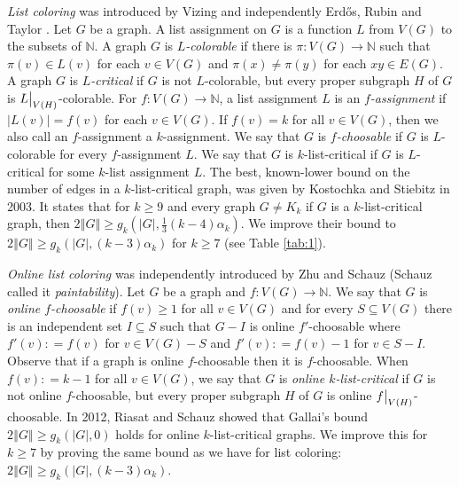 \documentclass[10pt]{article}
\theoremstyle{plain}
\theoremstyle{definition}
\theoremstyle{remark}
\newcommand{\IN}{\mathbb{N}}
\newcommand{\card}[1]{\left|#1\right|}
\newcommand{\size}[1]{\left\Vert#1\right\Vert}
\newcommand{\func}[3]{#1\colon #2 \rightarrow #3}
\newcommand{\DefinedAs}{\mathrel{\mathop:}=}
\newcommand\restr[2]{{%
  \left.\kern-\nulldelimiterspace %
  #1 %
  \vphantom{\big|} %
  \right|_{#2} %
  }}
\begin{document}
\emph{List coloring} was introduced by Vizing \cite{vizing1976} and independently Erd\H{o}s, Rubin and Taylor \cite{erdos1979choosability}.  Let $G$ be a graph. A list assignment on $G$ is a function $L$ from $V(G)$ to the subsets of $\IN$.   A graph $G$ is \emph{$L$-colorable} if there is $\func{\pi}{V(G)}{\IN}$ such that $\pi(v) \in L(v)$ for each $v \in V(G)$ and $\pi(x) \ne \pi(y)$ for each $xy \in E(G)$.   A graph $G$ is \emph{$L$-critical} if $G$ is not $L$-colorable, but every proper subgraph $H$ of $G$ is $\restr{L}{V(H)}$-colorable. For $\func{f}{V(G)}{\IN}$, a list assignment $L$ is an \emph{$f$-assignment} if $\card{L(v)} = f(v)$ for each $v \in V(G)$.  If $f(v) = k$ for all $v \in V(G)$, then we also call an $f$-assignment a $k$-assignment.  We say that $G$ is \emph{$f$-choosable} if $G$ is $L$-colorable for every $f$-assignment $L$.  
We say that $G$ is $k$-list-critical if $G$ is $L$-critical for some $k$-list assignment $L$. %
The best, known-lower bound on the number of edges in a $k$-list-critical graph, was given by Kostochka and Stiebitz \cite{kostochkastiebitzedgesincriticalgraph} in 2003. %
It states that for $k \ge 9$ and every graph $G \ne K_k$ if $G$ is a $k$-list-critical graph, then $2\size{G} \ge g_k(\card{G}, \frac13 (k-4)\alpha_k)$.  We improve their bound to $2\size{G} \ge g_k(\card{G}, (k-3)\alpha_k)$ for $k\ge7$ (see Table \ref{tab:1}).

\emph{Online list coloring} was independently introduced by Zhu \cite{zhu2009online} and Schauz \cite{schauz2009mr} (Schauz called it \emph{paintability}). Let $G$ be a graph and $\func{f}{V(G)}{\IN}$.  We say that $G$ is \emph{online $f$-choosable} if $f(v) \ge 1$ for all $v \in V(G)$ and for every $S \subseteq V(G)$ there is an independent set $I \subseteq S$ such that $G-I$ is online $f'$-choosable where $f'(v) \DefinedAs f(v)$ for $v \in V(G) - S$ and $f'(v) \DefinedAs f(v) - 1$ for $v \in S - I$. %
Observe that if a graph is online $f$-choosable then it is $f$-choosable. 
 When $f(v) \DefinedAs k-1$ for all $v \in V(G)$, we say that $G$ is \emph{online $k$-list-critical} if $G$ is not online $f$-choosable, 
  but every proper subgraph $H$ of $G$ is online $\restr{f}{V(H)}$-choosable.  In 2012, Riasat and Schauz \cite{riasat2012critically} showed that Gallai's bound  $2\size{G} \ge g_k(\card{G}, 0)$ holds for online $k$-list-critical graphs.  We improve this for $k \ge 7$ %
 by proving the same bound as we have for list coloring: $2\size{G} \ge g_k(\card{G}, (k-3)\alpha_k)$.
\end{document}
